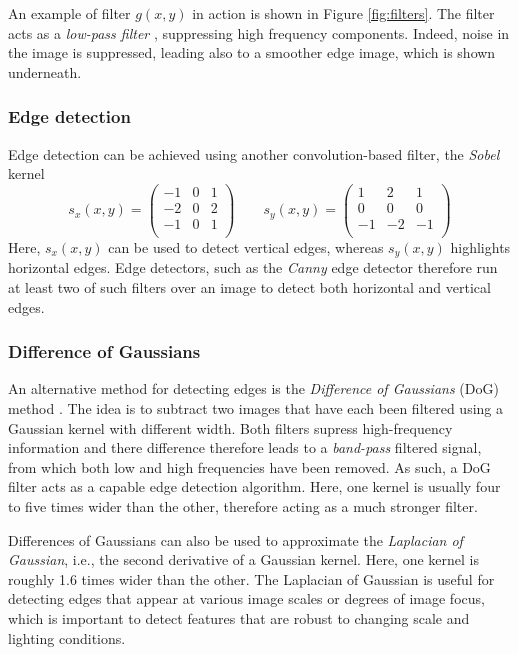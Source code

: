 An example of filter $g(x,y)$ in action is shown in Figure \ref{fig:filters}. The filter acts as a \emph{low-pass filter} , suppressing high frequency components. Indeed, noise in the image is suppressed, leading also to a smoother edge image, which is shown underneath.

\subsubsection{Edge detection}\label{sec:sobel}
Edge detection can be achieved using another convolution-based filter, the \emph{Sobel} kernel
\begin{equation}
s_x(x,y)=
\left(
\begin{array}{ccc}
-1 & 0 & 1\\
-2 & 0 & 2\\
-1 & 0 & 1\\
\end{array}
\right)
\qquad
s_y(x,y)=
\left(
\begin{array}{ccc}
1 & 2 & 1\\
0 & 0 & 0\\
-1 & -2 & -1\\
\end{array}
\right)
\end{equation}
Here, $s_x(x,y)$ can be used to detect vertical edges, whereas $s_y(x,y)$ highlights horizontal edges. Edge detectors, such as the \emph{Canny} edge detector  therefore run at least two of such filters over an image to detect both horizontal and vertical edges.

\subsubsection{Difference of Gaussians}
An alternative method for detecting edges is the \emph{Difference of Gaussians} (DoG) method . The idea is to subtract two images that have each been filtered using a Gaussian kernel with different width. Both filters supress high-frequency information and there difference therefore leads to a \emph{band-pass} filtered signal, from which both low and high frequencies have been removed. As such, a DoG filter acts as a capable edge detection algorithm. Here, one kernel is usually four to five times wider than the other, therefore acting as a much stronger filter.

Differences of Gaussians can also be used to approximate the \emph{Laplacian of Gaussian}, i.e., the second derivative of a Gaussian kernel. Here, one kernel is roughly 1.6 times wider than the other. The Laplacian of Gaussian is useful for detecting edges that appear at various image scales or degrees of image focus, which is important to detect features that are robust to changing scale and lighting conditions. 

